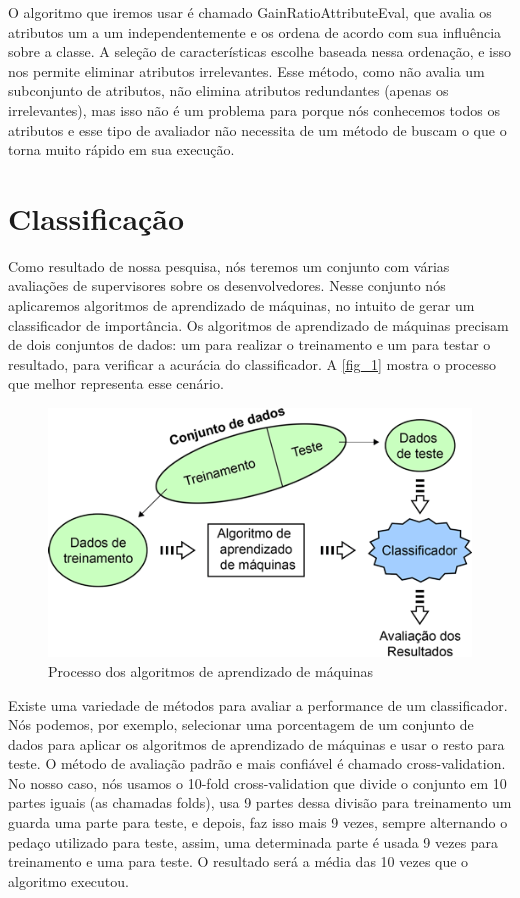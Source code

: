 O algoritmo que iremos usar é chamado GainRatioAttributeEval, que avalia os atributos um a um independentemente e os ordena de acordo com sua influência sobre a classe. A seleção de características escolhe baseada nessa ordenação, e isso nos permite eliminar atributos irrelevantes. Esse método, como não avalia um subconjunto de atributos, não elimina atributos redundantes (apenas os irrelevantes), mas isso não é um problema para  porque nós conhecemos todos os atributos e esse tipo de avaliador não necessita de um método de buscam o que o torna muito rápido em sua execução.

\section{Classificação}\label{secao3.4}

Como resultado de nossa pesquisa, nós teremos um conjunto com várias avaliações de supervisores sobre os desenvolvedores. Nesse conjunto nós aplicaremos algoritmos de aprendizado de máquinas, no intuito de gerar um classificador de importância. Os algoritmos de aprendizado de máquinas precisam de dois conjuntos de dados: um para realizar o treinamento e um para testar o resultado, para verificar a acurácia do classificador. A \autoref{fig_1} mostra o processo que melhor representa esse cenário.

\begin{figure}[p]
	\centering
	\includegraphics[scale=0.7]{figs/training-datasets-pequeno.png}
	\caption{\label{fig_1}Processo dos algoritmos de aprendizado de máquinas}
\end{figure}

Existe uma variedade de métodos para avaliar a performance de um classificador. Nós podemos, por exemplo, selecionar uma porcentagem de um conjunto de dados para aplicar os algoritmos de aprendizado de máquinas e usar o resto para teste. O método de avaliação padrão e mais confiável é chamado cross-validation. No nosso caso, nós usamos o 10-fold cross-validation que divide o conjunto em 10 partes iguais (as chamadas folds), usa 9 partes dessa divisão para treinamento um guarda uma parte para teste, e depois, faz isso mais 9 vezes, sempre alternando o pedaço utilizado para teste, assim, uma determinada parte é usada 9 vezes para treinamento e uma para teste. O resultado será a média das 10 vezes que o algoritmo executou.

